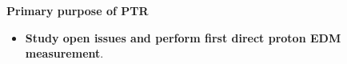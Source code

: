 \begin{frame}
\vspace{-0.25cm}
\begin{alertblock}{\small \textbf{Primary purpose of PTR}}
\begin{small}
		\begin{itemize}
		\item \textbf{Study open issues and perform first direct proton EDM measurement}.
	\end{itemize}
\end{small}
\end{alertblock}
\end{frame}
